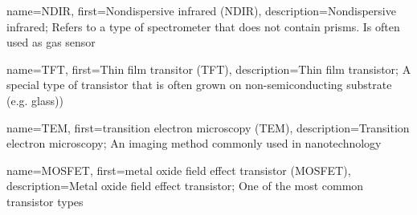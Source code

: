 {
    name={NDIR},
    first={Nondispersive infrared (NDIR)},
    description={Nondispersive infrared; Refers to a type of spectrometer that does not contain prisms. Is often used as gas sensor}
}

{
    name={TFT},
    first={Thin film transitor (TFT)},
    description={Thin film transistor; A special type of transistor that is often grown on non-semiconducting substrate (e.g. glass))}
}

{
    name={TEM},
    first={transition electron microscopy (TEM)},
    description={Transition electron microscopy; An imaging method commonly used in nanotechnology}
}

{
    name={MOSFET},
    first={metal oxide field effect transistor (MOSFET)},
    description={Metal oxide field effect transistor; One of the most common transistor types}
}

